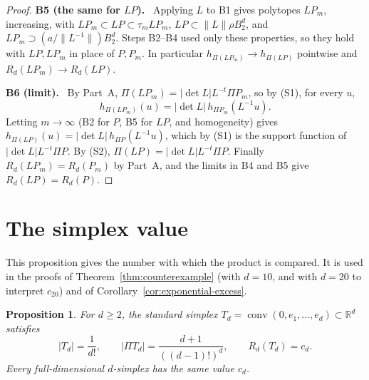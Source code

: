 \documentclass[11pt]{article}
\newtheorem{proposition}[theorem]{Proposition}
\newcommand{\R}{\mathbb R}
\DeclareMathOperator{\conv}{conv}
\newcommand{\step}[1]{\par\smallskip\noindent\textbf{#1}\ }
\begin{document}
\begin{proof}
\step{B5 (the same for \(LP\)).} Applying \(L\) to B1 gives polytopes
\(LP_m\), increasing, with \(LP_m\subset LP\subset\tau_mLP_m\),
\(LP\subset\|L\|\rho B_2^d\), and
\(LP_m\supset(a/\|L^{-1}\|)B_2^d\). Steps B2--B4 used only these
properties, so they hold with \(LP,LP_m\) in place of \(P,P_m\). In
particular \(h_{\Pi(LP_m)}\to h_{\Pi(LP)}\) pointwise and
\(R_d(LP_m)\to R_d(LP)\).

\step{B6 (limit).} By Part~A, \(\Pi(LP_m)=|\det L|L^{-t}\Pi P_m\), so
by (S1), for every \(u\),
\[
 h_{\Pi(LP_m)}(u)=|\det L|\,h_{\Pi P_m}(L^{-1}u).
\]
Letting \(m\to\infty\) (B2 for \(P\), B5 for \(LP\), and homogeneity)
gives \(h_{\Pi(LP)}(u)=|\det L|\,h_{\Pi P}(L^{-1}u)\), which by (S1)
is the support function of \(|\det L|L^{-t}\Pi P\). By (S2),
\(\Pi(LP)=|\det L|L^{-t}\Pi P\). Finally \(R_d(LP_m)=R_d(P_m)\) by
Part~A, and the limits in B4 and B5 give \(R_d(LP)=R_d(P)\).
\end{proof}

\section{The simplex value}\label{sec:simplex}

This proposition gives the number with which the product is compared.
It is used in the proofs of Theorem~\ref{thm:counterexample} (with
\(d=10\), and with \(d=20\) to interpret \(c_{20}\)) and of
Corollary~\ref{cor:exponential-excess}.

\begin{proposition}\label{prop:simplex}
For \(d\ge2\), the standard simplex
\(T_d=\conv(0,e_1,\ldots,e_d)\subset\R^d\) satisfies
\[
 |T_d|=\frac1{d!},\qquad
 |\Pi T_d|=\frac{d+1}{((d-1)!)^d},\qquad
 R_d(T_d)=c_d.
\]
Every full-dimensional \(d\)-simplex has the same value \(c_d\).
\end{proposition}
\end{document}
